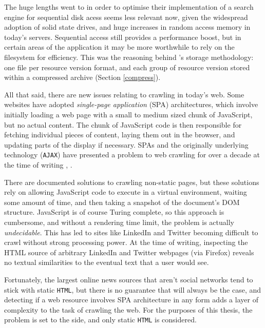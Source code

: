 The huge lengths  went to in order to optimise
their implementation of a search engine for sequential disk
acess seems less relevant now, given the widespread adoption of solid
state drives, and huge increases in random access memory in today's
servers.  Sequential access still provides a performance boost, but
in certain areas of the application it may be more worthwhile to
rely on the filesystem for efficiency.  This was the reasoning behind
\nr{}'s storage methodology: one file per resource version format,
and each group of resource version stored within a compressed archive
(Section \ref{compress}).

All that said, there are new issues relating to crawling in today's web.
Some websites have adopted {\it single-page application} (SPA)
architectures, which involve initially loading a web page
with a small to medium sized chunk of JavaScript, but no
actual content.  The chunk of JavaScript code is then responsible
for fetching individual pieces of content, laying them out in
the browser, and updating parts of the display if necessary.
SPAs and the originally underlying technology ({\tt AJAX}) have
presented a problem to web crawling for over a decade at the time
of writing \cite{matter2008}, \cite{mesbah2012}.

There are documented solutions to crawling non-static pages, but
these solutions rely on allowing JavaScript code to execute in
a virtual environment, waiting some amount of time, and
then taking a snapshot of the document's DOM structure.
JavaScript is of course Turing complete, so this approach is
cumbersome, and without a rendering time limit, the problem is
actually {\it undecidable}.  This has led to sites like LinkedIn and
Twitter becoming difficult to crawl without strong processing
power. At the time of writing, inspecting the HTML source of arbitrary
LinkedIn and Twitter webpages (via Firefox) reveals no textual
similarities to the eventual text that a user would see.

Fortunately, the largest online news sources that aren't social
networks tend to stick with static {\tt HTML}, but there is no
guarantee that will always be the case, and detecting if a web
resource involves SPA architecture in any form adds a layer of
complexity to the task of crawling the web.  For the purposes of
this thesis, the problem is set to the side, and only static
{\tt HTML} is considered.

